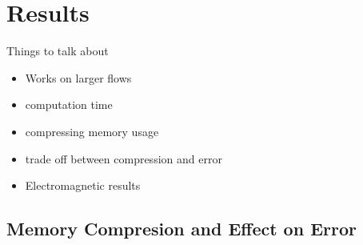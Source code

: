 \documentclass{article}
\begin{document}
\section{Results}

Things to talk about

\begin{itemize}
  \item Works on larger flows
  \item computation time
  \item compressing memory usage
  \item trade off between compression and error
  \item Electromagnetic results
\end{itemize}

\subsection{Memory Compresion and Effect on Error}
\end{document}
